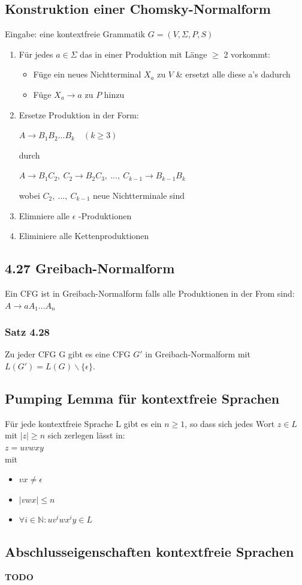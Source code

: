 \documentclass[11pt]{article}
\begin{document}
\subsection{Konstruktion einer Chomsky-Normalform}
\label{sec:org4bb6749}
Eingabe: eine kontextfreie Grammatik \(G = (V, \Sigma, P, S)\)
\begin{enumerate}
\item Für jedes \(a\in \Sigma\) das in einer Produktion mit Länge \(\ge\) 2 vorkommt:
\begin{itemize}
\item Füge ein neues Nichtterminal \(X_a\) zu \(V\) \& ersetzt alle diese a's dadurch
\item Füge \(X_a \rightarrow a\) zu \(P\) hinzu
\end{itemize}
\item Ersetze Produktion in der Form: \\
\begin{center}
\(A\rightarrow B_1B_2...B_k\quad (k\ge 3)\)
\end{center}
durch \\
\begin{center}
\(A\rightarrow B_1C_2,\ C_2\rightarrow B_2C_3,\ ...,\ C_{k-1}\rightarrow B_{k-1}B_k\) \\
\end{center}
wobei \(C_2,\ ...,\ C_{k-1}\) neue Nichtterminale sind
\item Elimniere alle \(\epsilon\) -Produktionen
\item Eliminiere alle Kettenproduktionen
\end{enumerate}

\subsection{4.27 Greibach-Normalform}
\label{sec:orge3326d6}
Ein CFG ist in Greibach-Normalform falls alle Produktionen in der From sind: \\
\(A\rightarrow aA_1...A_n\)

\subsubsection{Satz 4.28}
\label{sec:org10842d0}
Zu jeder CFG G gibt es eine CFG \(G′\) in Greibach-Normalform mit \\
\(L(G') = L(G) \backslash \{\epsilon\}\).

\subsection{Pumping Lemma für kontextfreie Sprachen}
\label{sec:orgb160e7b}
Für jede kontextfreie Sprache L gibt es ein \(n \ge 1\), so dass sich jedes Wort \(z\in L\) mit \(|z| \ge n\) sich zerlegen lässt in: \\
\(z = uvwxy\) \\
mit
\begin{itemize}
\item \(vx \ne \epsilon\)
\item \(|vwx| \le n\)
\item \(\forall i \in \mathbb{N} : uv^iwx^iy\in L\)
\end{itemize}

\subsection{Abschlusseigenschaften kontextfreie Sprachen}
\label{sec:org1019adc}
\textbf{TODO}
\end{document}
